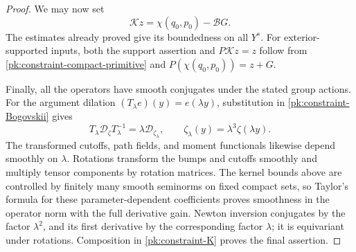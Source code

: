 \begin{proof}
We may now set
\begin{equation}
 \mathcal Kz=\chi(q_0,p_0)-\mathcal BG.
 \label{pk:constraint-K}
\end{equation}
The estimates already proved give its boundedness on all \(Y^s\).
For exterior-supported inputs, both the support assertion and
\(P\mathcal Kz=z\) follow from
\eqref{pk:constraint-compact-primitive} and \(P(\chi(q_0,p_0))=z+G\).

Finally, all the operators have smooth conjugates under the stated
group actions.  For the argument dilation
\((T_\lambda e)(y)=e(\lambda y)\), substitution in
\eqref{pk:constraint-Bogovskii} gives
\begin{equation}
 T_\lambda\mathcal D_\zeta T_\lambda^{-1}
        =\lambda\mathcal D_{\zeta_\lambda},\qquad
 \zeta_\lambda(y)=\lambda^3\zeta(\lambda y).
 \label{pk:constraint-conjugation}
\end{equation}
The transformed cutoffs, path fields, and moment functionals likewise
depend smoothly on \(\lambda\).  Rotations transform the bumps and
cutoffs smoothly and multiply tensor components by rotation matrices.
The kernel bounds above are controlled by finitely many smooth
seminorms on fixed compact sets, so Taylor's formula for these
parameter-dependent coefficients proves smoothness in the operator
norm with the full derivative gain.  Newton inversion conjugates by
the factor \(\lambda^2\), and its first derivative by the corresponding
factor \(\lambda\); it is equivariant under rotations.
Composition in \eqref{pk:constraint-K} proves the final assertion.
\end{proof}

